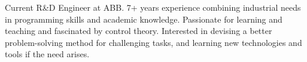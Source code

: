 

\begin{cvparagraph}

Current R\&D Engineer at ABB. 7+ years experience combining industrial needs in programming skills and academic knowledge.
Passionate for learning and teaching and fascinated by control theory.
Interested in devising a better problem-solving method for challenging tasks, and
learning new technologies and tools if the need arises.
\end{cvparagraph}
